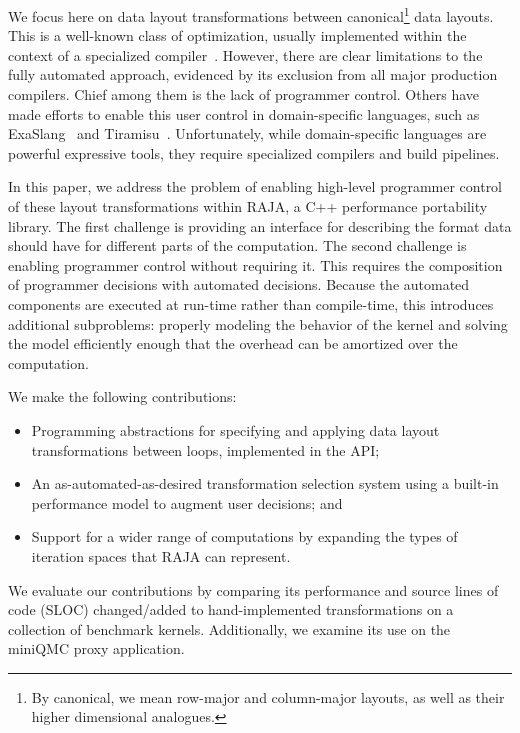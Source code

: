 We focus here on data layout transformations between canonical\footnote{By canonical, we mean row-major and column-major layouts, as well as their higher dimensional analogues.} data layouts.
This is a well-known class of optimization, usually implemented within the context of a specialized compiler~\cite{bixby1994automatic,kennedy1995automatic,kennedy1998automatic,chen2004ilp,chen2005constraint,chen2005integrating, ozturk2011data}.
However, there are clear limitations to the fully automated approach, evidenced by its exclusion from all major production compilers.
Chief among them is the lack of programmer control.
Others have made efforts to enable this user control in domain-specific languages, such as ExaSlang~\cite{kronawitter2018automatic} and Tiramisu~\cite{baghdadi2019tiramisu}.
Unfortunately, while domain-specific languages are powerful expressive tools, they require specialized compilers and build pipelines. 

In this paper, we address the problem of enabling high-level programmer control of these layout transformations within RAJA, a C++ performance portability library.
The first challenge is providing an interface for describing the format data should have for different parts of the computation.
The second challenge is enabling programmer control without requiring it.
This requires the composition of programmer decisions with automated decisions.
Because the automated components are executed at run-time rather than compile-time, this introduces additional subproblems: properly modeling the behavior of the kernel and solving the model efficiently enough that the overhead can be amortized over the computation.

We make the following contributions:
\begin{itemize}
\item Programming abstractions for specifying and applying data layout transformations between loops, implemented in the \FormatDecisions{} API;
\item An as-automated-as-desired transformation selection system using a built-in performance model to augment user decisions; and 
\item Support for a wider range of computations by expanding the types of iteration spaces that RAJA can represent.
\end{itemize}
We evaluate our contributions by comparing its performance and source lines of code (SLOC) changed/added to hand-implemented transformations on a collection of benchmark kernels.
Additionally, we examine its use on the miniQMC proxy application.

